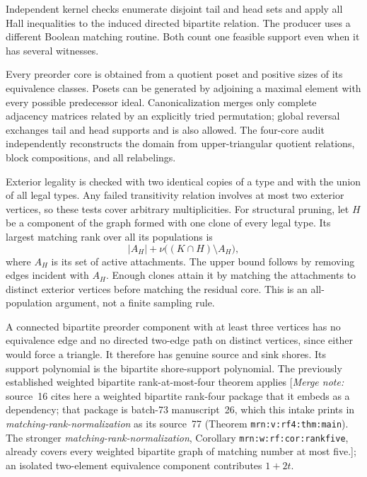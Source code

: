 \documentclass[11pt]{article}
\numberwithin{equation}{section}
\theoremstyle{definition}\newtheorem{definition}[theorem]{Definition}\newtheorem{remark}[theorem]{Remark}
\newcommand{\mnote}[1]{[\textit{Merge note:} #1]}
\newcommand{\mrn}{\emph{matching-rank-normalization}}
\begin{document}
Independent kernel checks enumerate disjoint tail and head sets and apply all Hall inequalities to the induced directed bipartite relation. The producer uses a different Boolean matching routine. Both count one feasible support even when it has several witnesses.

Every preorder core is obtained from a quotient poset and positive sizes of its equivalence classes. Posets can be generated by adjoining a maximal element with every possible predecessor ideal. Canonicalization merges only complete adjacency matrices related by an explicitly tried permutation; global reversal exchanges tail and head supports and is also allowed. The four-core audit independently reconstructs the domain from upper-triangular quotient relations, block compositions, and all relabelings.

Exterior legality is checked with two identical copies of a type and with the union of all legal types. Any failed transitivity relation involves at most two exterior vertices, so these tests cover arbitrary multiplicities. For structural pruning, let $H$ be a component of the graph formed with one clone of every legal type. Its largest matching rank over all its populations is
\[
 |A_H|+\nu\bigl((K\cap H)\setminus A_H\bigr),
\]
where $A_H$ is its set of active attachments. The upper bound follows by removing edges incident with $A_H$. Enough clones attain it by matching the attachments to distinct exterior vertices before matching the residual core. This is an all-population argument, not a finite sampling rule.

A connected bipartite preorder component with at least three vertices has no equivalence edge and no directed two-edge path on distinct vertices, since either would force a triangle. It therefore has genuine source and sink shores. Its support polynomial is the bipartite shore-support polynomial. The previously established weighted bipartite rank-at-most-four theorem applies \mnote{source~16 cites here a weighted bipartite
rank-four package that it embeds as a dependency; that package is
batch-73 manuscript~26, which this intake prints in \mrn{} as its
source~77 (Theorem \texttt{mrn:v:rf4:thm:main}). The stronger
\mrn, Corollary \texttt{mrn:w:rf:cor:rankfive}, already covers every
weighted bipartite graph of matching number at most five.}; an isolated two-element equivalence component contributes $1+2t$.
\end{document}
